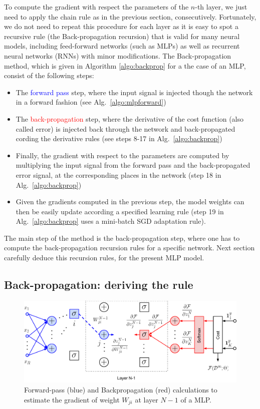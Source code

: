 To compute the gradient with respect the parameters of the $n$-th layer, we
just need to apply the chain rule as in the previous section, consecutively.
Fortunately, we do not need to repeat this procedure for each layer as it is
easy to spot a recursive rule (the Back-propagation recursion) that is valid
for many neural models, including feed-forward networks (such as MLPs) as well
as recurrent neural networks (RNNs) with minor modifications. The
Back-propagation method, which is given in Algorithm \ref{algo:backprop} for a
the case of an MLP, consist of the following steps:

\begin{itemize}
\item The \textcolor{blue}{forward pass} step, where the input signal is injected though the network  in a forward fashion (see Alg.~\ref{algo:mlpforward})
\item The \textcolor{red}{back-propagation} step, where the derivative of the cost function (also called error) is injected back through the network and back-propagated cording the derivative rules (see steps 8-17 in Alg.~\ref{algo:backprop})
\item Finally, the gradient with respect to the parameters are computed by multiplying the input signal from the forward pass and the back-propagated error signal, at the corresponding places in the network (step 18 in Alg.~\ref{algo:backprop})
\item Given the gradients computed in the previous step, the model weights can then be easily update according a specified learning rule (step 19 in Alg.~\ref{algo:backprop} uses a mini-batch SGD adaptation rule).
\end{itemize}

The main step of the method is the back-propagation step, where one has to compute the back-propagation recursion rules for a specific network.
Next section carefully deduce this recursion rules, for the present MLP model. 


\subsection{Back-propagation: deriving the rule}

\begin{figure}[!h]
\centering
\includegraphics[scale=0.6]{figs/deep_learning/NN_backprop_colored.pdf}
\caption{Forward-pass (blue) and Backpropagation (red) calculations to estimate the gradient of weight $W_{ji}$ at layer $N-1$ of a MLP.}
\label{fig:NN_color}
\end{figure}


